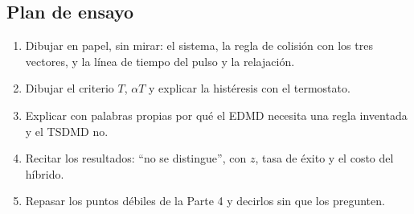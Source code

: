 \documentclass[10.5pt,a4paper]{article}
\begin{document}
\subsection{Plan de ensayo}
\begin{enumerate}
\item Dibujar en papel, sin mirar: el sistema, la regla de colisión con los tres vectores, y la línea de tiempo del pulso y la relajación.
\item Dibujar el criterio $T$, $\alpha T$ y explicar la histéresis con el termostato.
\item Explicar con palabras propias por qué el EDMD necesita una regla inventada y el TSDMD no.
\item Recitar los resultados: ``no se distingue'', con $z$, tasa de éxito y el costo del híbrido.
\item Repasar los puntos débiles de la Parte 4 y decirlos sin que los pregunten.
\end{enumerate}
\end{document}
